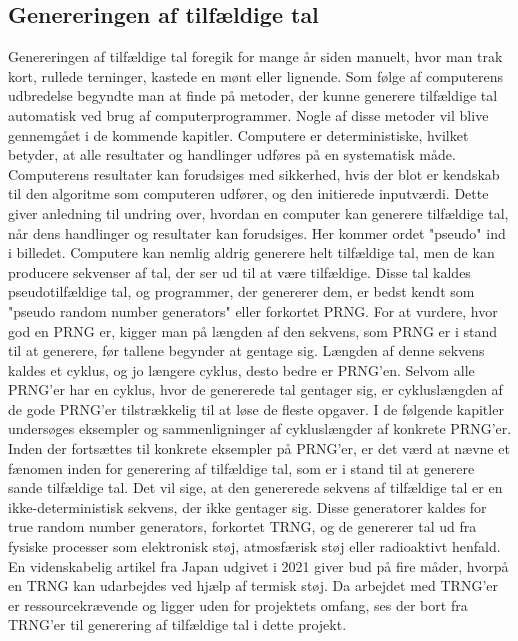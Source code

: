 \subsection{Genereringen af tilfældige tal}
Genereringen af tilfældige tal foregik for mange år siden manuelt, hvor man trak kort, rullede terninger, kastede en mønt eller lignende. Som følge af computerens udbredelse begyndte man at finde på metoder, der kunne generere tilfældige tal automatisk ved brug af computerprogrammer. Nogle af disse metoder vil blive gennemgået i de kommende kapitler.
Computere er deterministiske, hvilket betyder, at alle resultater og handlinger udføres på en systematisk måde. Computerens resultater kan forudsiges med sikkerhed, hvis der blot er kendskab til den algoritme som computeren udfører, og den initierede inputværdi. Dette giver anledning til undring over, hvordan en computer kan generere tilfældige tal, når dens handlinger og resultater kan forudsiges. Her kommer ordet "pseudo" ind i billedet. Computere kan nemlig aldrig generere helt tilfældige tal, men de kan producere sekvenser af tal, der ser ud til at være tilfældige. Disse tal kaldes pseudotilfældige tal, og programmer, der genererer dem, er bedst kendt som "pseudo random number generators" eller forkortet PRNG. For at vurdere, hvor god en PRNG er, kigger man på længden af den sekvens, som PRNG er i stand til at generere, før tallene begynder at gentage sig. Længden af denne sekvens kaldes et cyklus, og jo længere cyklus, desto bedre er PRNG'en. Selvom alle PRNG'er har en cyklus, hvor de genererede tal gentager sig, er cykluslængden af de gode PRNG'er tilstrækkelig til at løse de fleste opgaver. I de følgende kapitler undersøges eksempler og sammenligninger af cykluslængder af konkrete PRNG'er. Inden der fortsættes til konkrete eksempler på PRNG'er, er det værd at nævne et fænomen inden for generering af tilfældige tal, som er i stand til at generere sande tilfældige tal. Det vil sige, at den genererede sekvens af tilfældige tal er en ikke-deterministisk sekvens, der ikke gentager sig. Disse generatorer kaldes for true random number generators, forkortet TRNG, og de genererer tal ud fra fysiske processer som elektronisk støj, atmosfærisk støj eller radioaktivt henfald. En videnskabelig artikel fra Japan udgivet i 2021
\cite{Matsuoka2021} 
giver bud på fire måder, hvorpå en TRNG kan udarbejdes ved hjælp af termisk støj. Da arbejdet med TRNG'er er ressourcekrævende og ligger uden for projektets omfang, ses der bort fra TRNG'er til generering af tilfældige tal i dette projekt.

